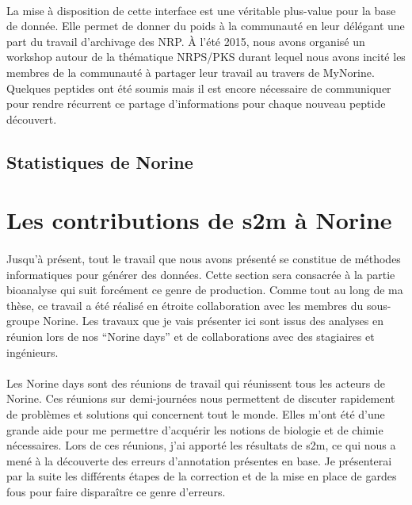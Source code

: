 \documentclass[12pt,french,twoside]{report}
\begin{document}
\paragraph{}La mise à disposition de cette interface est une véritable plus-value pour la base de donnée.
Elle permet de donner du poids à la communauté en leur délégant une part du travail d'archivage des NRP.
À l'été 2015, nous avons organisé un workshop autour de la thématique NRPS/PKS durant lequel nous avons incité les membres de la communauté à partager leur travail au travers de MyNorine.
Quelques peptides ont été soumis mais il est encore nécessaire de communiquer pour rendre récurrent ce partage d'informations pour chaque nouveau peptide découvert.


\subsection{Statistiques de Norine}








\section{Les contributions de s2m à Norine}

\paragraph{}Jusqu'à présent, tout le travail que nous avons présenté se constitue de méthodes informatiques pour générer des données.
Cette section sera consacrée à la partie bioanalyse qui suit forcément ce genre de production.
Comme tout au long de ma thèse, ce travail a été réalisé en étroite collaboration avec les membres du sous-groupe Norine.
Les travaux que je vais présenter ici sont issus des analyses en réunion lors de nos ``Norine days'' et de collaborations avec des stagiaires et ingénieurs.

\paragraph{}Les Norine days sont des réunions de travail qui réunissent tous les acteurs de Norine.
Ces réunions sur demi-journées nous permettent de discuter rapidement de problèmes et solutions qui concernent tout le monde.
Elles m'ont été d'une grande aide pour me permettre d'acquérir les notions de biologie et de chimie nécessaires.
Lors de ces réunions, j'ai apporté les résultats de s2m, ce qui nous a mené à la découverte des erreurs d'annotation présentes en base.
Je présenterai par la suite les différents étapes de la correction et de la mise en place de gardes fous pour faire disparaître ce genre d'erreurs.
\end{document}
